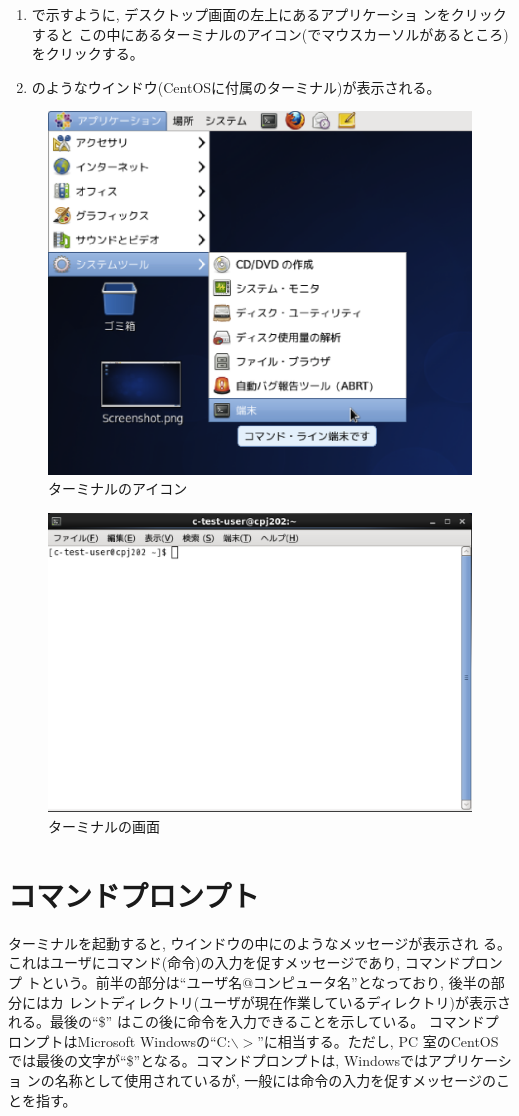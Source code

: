 \begin{enumerate}
\item {}で示すように, デスクトップ画面の左上にあるアプリケーショ
      ンをクリックすると
      この中にあるターミナルのアイコン(でマウスカーソルがあるところ)をクリックする。
\item {}のようなウインドウ(CentOSに付属のターミナル)が表示される。
\end{enumerate}

\begin{figure}[htbp]
\begin{center}
\includegraphics[width=0.5\linewidth]{menu.eps}
\caption{ターミナルのアイコン}
\label{fig:menu}
\end{center}
\end{figure}

\begin{figure}[htbp]
\begin{center}
\includegraphics[width=0.5\linewidth]{terminal.eps}
\caption{ターミナルの画面}
\label{fig:terminal}
\end{center}
\end{figure}

\section{コマンドプロンプト }

ターミナルを起動すると, ウインドウの中にのようなメッセージが表示され
る。これはユーザにコマンド(命令)の入力を促すメッセージであり, コマンドプロンプ
トという。前半の部分は``ユーザ名@コンピュータ名''となっており, 後半の部分にはカ
レントディレクトリ(ユーザが現在作業しているディレクトリ)が表示される。最後の``\$''
はこの後に命令を入力できることを示している。
コマンドプロンプトはMicrosoft Windowsの``C:$\backslash>$''に相当する。ただし, PC
室のCentOSでは最後の文字が``\$''となる。コマンドプロンプトは, Windowsではアプリケーショ
ンの名称として使用されているが, 一般には命令の入力を促すメッセージのことを指す。


